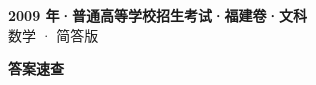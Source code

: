 \documentclass[zihao=-4, a4paper]{ctexart}
\begin{document}
\begin{center}
  {\Large\bfseries 2009 年·普通高等学校招生考试·福建卷·文科}\\[4pt]
  {\large 数学 · 简答版}
\end{center}
\medskip
{}

\clearpage
{}
\begin{center}{\Large\bfseries 答案速查}\end{center}
\medskip

\end{document}
